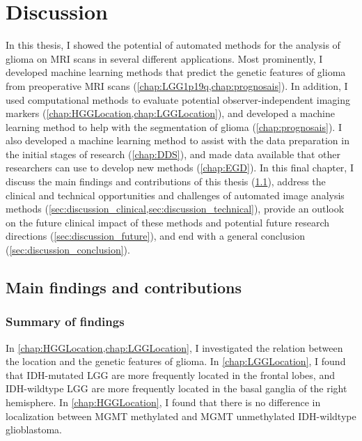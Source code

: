 
\chapter{Discussion}\label{chap:discussion}



\begin{ChapterAbstractNoTitle}
\end{ChapterAbstractNoTitle}
In this thesis, I showed the potential of automated methods for the analysis of glioma on \gls{MRI} scans in several different applications.
Most prominently, I developed machine learning methods that predict the genetic features of glioma from preoperative \gls{MRI} scans (\cref{chap:LGG1p19q,chap:prognosais}).
In addition, I used computational methods to evaluate potential observer-independent imaging markers (\cref{chap:HGGLocation,chap:LGGLocation}), and developed a machine learning method to help with the segmentation of glioma (\cref{chap:prognosais}).
I also developed a machine learning method to assist with the data preparation in the initial stages of research (\cref{chap:DDS}), and made data available that other researchers can use to develop new methods (\cref{chap:EGD}).
In this final chapter, I discuss the main findings and contributions of this thesis (\cref{sec:discussion_main_findings}), address the clinical and technical opportunities and challenges of automated image analysis methods (\cref{sec:discussion_clinical,sec:discussion_technical}), provide an outlook on the future clinical impact of these methods and potential future research directions (\cref{sec:discussion_future}), and end with a general conclusion (\cref{sec:discussion_conclusion}).

\section{Main findings and contributions}\label{sec:discussion_main_findings}

\subsection{Summary of findings}

In \cref{chap:HGGLocation,chap:LGGLocation}, I investigated the relation between the location and the genetic features of \gls{glioma}.
In \cref{chap:LGGLocation}, I found that \gls{IDH}-mutated \gls{LGG} are more frequently located in the frontal lobes, and \gls{IDH}-wildtype \gls{LGG} are more frequently located in the basal ganglia of the right hemisphere.
In \cref{chap:HGGLocation}, I found that there is no difference in localization between \gls{MGMT} methylated and \gls{MGMT} unmethylated \gls{IDH}-wildtype glioblastoma.


